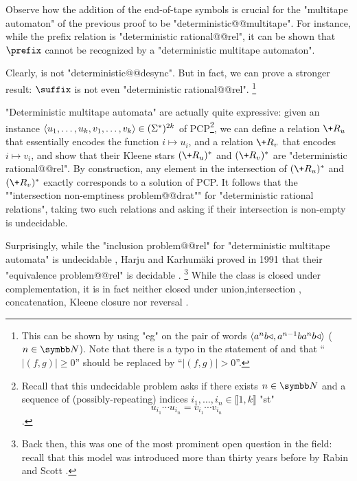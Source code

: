 Observe how the addition of the end-of-tape symbols is crucial for the "multitape automaton"
of the previous proof to be "deterministic@@multitape". For instance, while
the prefix relation is "deterministic rational@@rel", it can be shown that
$\prefix$ cannot be recognized by a "deterministic multitape automaton".

Clearly,  is not "deterministic@@desync".
But in fact, we can prove a stronger result: $\suffix$ is not even "deterministic rational@@rel".%
\footnote{This can be shown by using "eg"
\cite[Lemma~IV.5.15]{Sakarovitch2009Elements} on the pair of words
$\langle a^n b \triangleleft, a^{n-1} b a^n b \triangleleft\rangle$ ($n\in\N$).
Note that there is a typo in
the statement of \cite[Lemma~IV.5.15]{Sakarovitch2009Elements} and that
``$|(f,g)| \geq 0$'' should be replaced by ``$|(f,g)| > 0$''.}

\begin{example}
	\AP\label{ex:PCP-is-det-rat}
	"Deterministic multitape automata" are actually quite expressive:
	given an instance $\langle u_1,\hdots,u_k, v_1,\hdots,v_k\rangle \in (\Sigma^*)^{2k}$ 
	of PCP\footnote{Recall that this undecidable problem asks if there exists $n\in\N$
	and a sequence of (possibly-repeating)
	indices $i_1,\hdots, i_n \in \lBrack 1,k\rBrack$ "st"
	\[u_{i_1}\cdots u_{i_n} = v_{i_1}\cdots v_{i_n}\].},
	we can define a relation $\+R_u$ that essentially encodes the function
	$i \mapsto u_i$, and a relation $\+R_v$ that encodes $i \mapsto v_i$,
	and show that their Kleene stars $(\+R_u)^*$ and $(\+R_v)^*$ are "deterministic rational@@rel".
	By construction, any element in the intersection of $(\+R_u)^*$ and $(\+R_v)^*$
	exactly corresponds to a solution of PCP.
	It follows that the \AP""intersection non-emptiness problem@@drat""
	for "deterministic rational relations",
	taking two such relations and asking if their intersection is non-empty is undecidable.
\end{example}

Surprisingly, while the "inclusion problem@@rel" for "deterministic multitape automata" is undecidable
\cite{FischerRosenberg1968Multitape}, Harju and Karhumäki proved in 1991 that their
"equivalence problem@@rel"
is decidable \cite[Theorem~3.11]{HarjuKarhumaki1991Equivalence}.%
\footnote{Back then, this was one of the most prominent open question in the field: recall that 
this model was introduced more than thirty years before by Rabin
and Scott \cite{RabinScott1959FiniteAutomata}.}
While the class is closed under complementation, it is in fact neither closed under union,intersection \cite[Theorem~17]{RabinScott1959FiniteAutomata},
concatenation, Kleene closure nor reversal
\cite[Table~1]{FischerRosenberg1968Multitape}.

